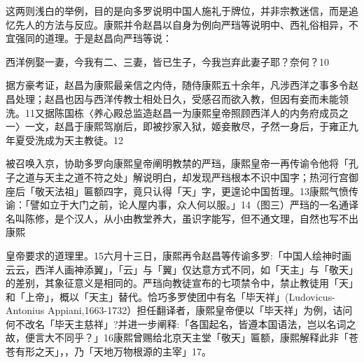 这两则浅白的举例，目的是向多罗说明中国人施礼于牌位，并非宗教迷信，而是追忆先人的方法与反应。康熙并令赵昌以自身为例向严珰等说明中、西礼俗相异，不宜强同的道理。于是赵昌向严珰等说：

\begin{BookQuote}
西洋例娶一妻，今我有二、三妻，皆已生子，今我岂弃此妻子耶？奈何？10
\end{BookQuote}

据方豪考证，赵昌为康熙最亲信之内侍，随侍康熙五十余年，凡涉西洋之事多令赵昌处理；赵昌也因与西洋传教士相处日久，受感召而欲入教，但因有妾而未能领洗。11又据陈国栋〈养心殿总监造赵昌一为康熙皇帝照顾西洋人的内务府成员之一〉一文，赵昌于康熙驾崩后，即被抄家入狱，姬妾散尽，孑然一身后，于雍正九年夏受洗成为天主教徒。12

被召唤入京，协助多罗向康熙皇帝阐明教禁的严珰，康熙皇帝一再传谕令他将「孔子之道与天主之道不符之处」解说明白，却发现严珰根本不识中国字；热河行宫御座后「敬天法祖」匾额四字，竟只认得「天」字，更遑论中国哲理。13康熙气愤传谕：「譬如立于大门之前，论人屋内事，众人何以服。」14（图三）严珰的一名通译名叫陈修，是个汉人，从小由教堂养大，虽识字能写，但不通文理，自然也写不出康熙

\vfill
\begin{BookNotes}
\end{BookNotes}


\noindent 皇帝要求的道理里。15六月十三日，康熙再令赵昌等传谕多罗:「中国人绘神时画云云，西洋人画神添翼」，「云」与「翼」仅达意方式不同，如「天主」与「敬天」的差别，其象征意义是相同的。严珰向教徒宣布的七项禁令中，禁止教徒用「天」和「上帝」，概以「天主」替代。恰巧多罗使团中有名「毕天祥」(Ludovicus-Antonius Appiani,1663-1732）担任翻译者，康熙皇帝便以「毕天祥」为例，诘问何不改名「毕天主慈祥」?并进一步阐释:「各国起名，皆遵本国语法，岂以名词之故，便言大不同乎？」16康熙曾赐给北京天主堂「敬天」匾额，康熙解释此非「苍苍有形之天」，，乃「天地万物根源的主宰」17。

